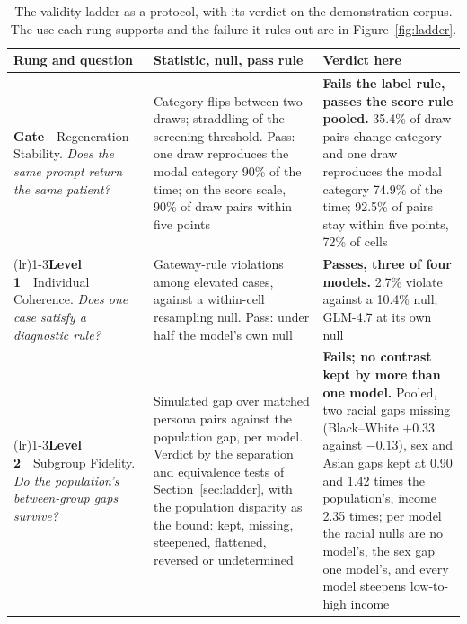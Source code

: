\documentclass[wcp]{jmlr}
\begin{document}
\begin{table}[!t]
\centering\scriptsize
\setlength{\tabcolsep}{3pt}
\renewcommand{\arraystretch}{0.48}
\caption{The validity ladder as a protocol, with its verdict on the demonstration corpus. The use each rung supports and the failure it rules out are in Figure~\ref{fig:ladder}.}
\label{tab:protocol}
\begin{tabular}{@{}>{\raggedright\arraybackslash}p{30mm}>{\raggedright\arraybackslash}p{52mm}>{\raggedright\arraybackslash}p{63mm}@{}}
\toprule
\textbf{Rung and question} & \textbf{Statistic, null, pass rule} & \textbf{Verdict here} \\
\midrule
\textbf{Gate}\ \ Regeneration Stability. \emph{Does the same prompt return the same patient?}
 & Category flips between two draws; straddling of the screening threshold. Pass: one draw reproduces the modal category 90\% of the time; on the score scale, 90\% of draw pairs within five points
 & \textbf{Fails the label rule, passes the score rule pooled.} 35.4\% of draw pairs change category and one draw reproduces the modal category 74.9\% of the time; 92.5\% of pairs stay within five points, 72\% of cells \\
\addlinespace[2pt]\cmidrule(lr){1-3}\addlinespace[2pt]
\textbf{Level 1}\ \ Individual Coherence. \emph{Does one case satisfy a diagnostic rule?}
 & Gateway-rule violations among elevated cases, against a within-cell resampling null. Pass: under half the model's own null
 & \textbf{Passes, three of four models.} 2.7\% violate against a 10.4\% null; GLM-4.7 at its own null \\
\addlinespace[2pt]\cmidrule(lr){1-3}\addlinespace[2pt]
\textbf{Level 2}\ \ Subgroup Fidelity. \emph{Do the population's between-group gaps survive?}
 & Simulated gap over matched persona pairs against the population gap, per model. Verdict by the separation and equivalence tests of Section~\ref{sec:ladder}, with the population disparity as the bound: kept, missing, steepened, flattened, reversed or undetermined
 & \textbf{Fails; no contrast kept by more than one model.} Pooled, two racial gaps missing (Black--White $+0.33$ against $-0.13$), sex and Asian gaps kept at 0.90 and 1.42 times the population's, income 2.35 times; per model the racial nulls are no model's, the sex gap one model's, and every model steepens low-to-high income \\

\end{tabular}
\end{table}
\end{document}
